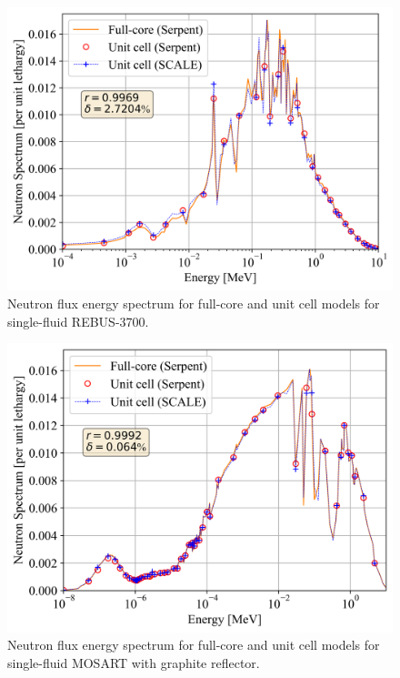 \documentclass[letterpaper]{mandc2019}
\begin{document}
\begin{figure}[!htb]
  \centering
  \includegraphics[scale=0.58]{./Figures/rebus_full_vs_unit_spectrum.png}
        \vspace{-0.25in}
  \caption{Neutron flux energy spectrum for full-core and unit cell models for single-fluid REBUS-3700.}
  \vspace{-0.2in}
  \label{fig:spectrum_rebus}
\end{figure}
\begin{figure}[!htb]
  \centering
  \includegraphics[scale=0.58]{./Figures/mosart_full_vs_unit_spectrum.png}
        \vspace{-0.25in}
  \caption{Neutron flux energy spectrum for full-core and unit cell models for single-fluid \gls{MOSART} with graphite reflector.}
  \label{fig:spectrum_mosart}
\end{figure}
\end{document}
